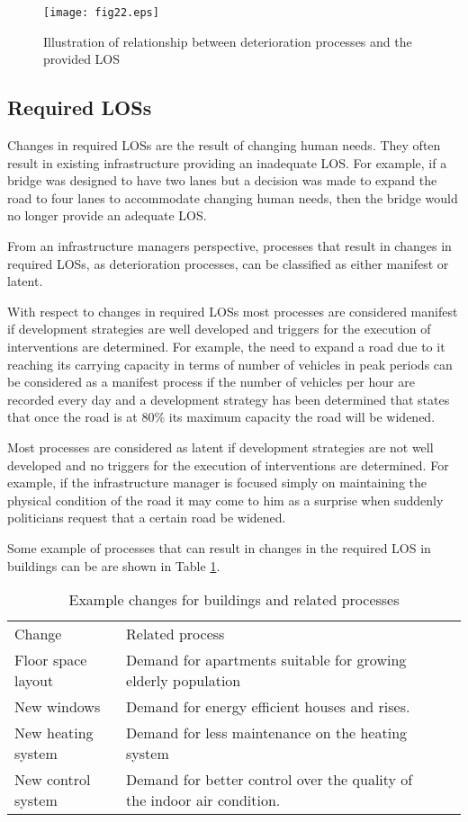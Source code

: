 \begin{figure}[h]
\texttt{[image: fig22.eps]}
\caption{Illustration of relationship between deterioration processes and the provided LOS}\label{fig22}
\end{figure}

\subsection{Required LOSs}

Changes in required LOSs are the result of changing human needs. They often result in existing infrastructure providing an inadequate LOS. For example, if a bridge was designed to have two lanes but a decision was made to expand the road to four lanes to accommodate changing human needs, then the bridge would no longer provide an adequate LOS.

From an infrastructure managers perspective, processes that result in changes in required LOSs, as deterioration processes, can be classified as either manifest or latent. 

With respect to changes in required LOSs most processes are considered manifest if development strategies are well developed and triggers for the execution of interventions are determined. For example, the need to expand a road due to it reaching its carrying capacity in terms of number of vehicles in peak periods can be considered as a manifest process if the number of vehicles per hour are recorded every day and a development strategy has been determined that states that once the road is at 80\% its maximum capacity the road will be widened. 

Most processes are considered as latent if development strategies are not well developed and no triggers for the execution of interventions are determined. For example, if the infrastructure manager is focused simply on maintaining the physical condition of the road it may come to him as a surprise when suddenly politicians request that a certain road be widened. 

Some example of processes that can result in changes in the required LOS in buildings can be are shown in Table \ref{tbl:212}.

\begin{table}
\caption{Example changes for buildings and related processes}
\begin{tabular}{|l|l|ll}
\cline{1-2}
Change & Related process &  &  \\ 
\cline{1-2}
Floor space layout & Demand for apartments suitable for growing elderly population &  &  \\ 
\cline{1-2}
New windows & Demand for energy efficient houses and rises.  &  &  \\ 
\cline{1-2}
New heating system & Demand for less maintenance on the heating system &  &  \\ 
\cline{1-2}
New control system & Demand for better control over the quality of the indoor air condition. &  &  \\ 
\cline{1-2}
\end{tabular}
\label{tbl:212}
\end{table}

